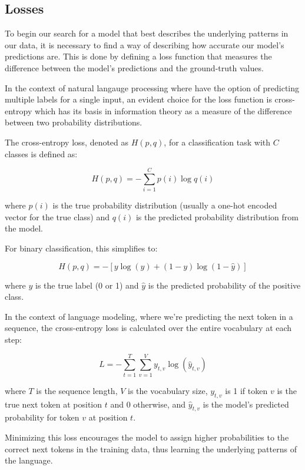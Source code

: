 \documentclass[a4paper, oneside]{discothesis}
\begin{document}
\subsection{Losses}
To begin our search for a model that best describes the underlying patterns in our data, it is necessary to find a way of describing how accurate our model's predictions are.
This is done by defining a loss function that measures the difference between the model's predictions and the ground-truth values.

In the context of natural langauge processing where have the option of predicting multiple labels for a single input, an evident choice for the loss function is cross-entropy which 
has its basis in information theory as a measure of the difference between two probability distributions.

The cross-entropy loss, denoted as $H(p,q)$, for a classification task with $C$ classes is defined as:

\begin{equation}
    H(p,q) = -\sum_{i=1}^C p(i) \log q(i)
\end{equation}

where $p(i)$ is the true probability distribution (usually a one-hot encoded vector for the true class) and $q(i)$ is the predicted probability distribution from the model.

For binary classification, this simplifies to:

\begin{equation}
    H(p,q) = -[y \log(\hat{y}) + (1-y) \log(1-\hat{y})]
\end{equation}

where $y$ is the true label (0 or 1) and $\hat{y}$ is the predicted probability of the positive class.

In the context of language modeling, where we're predicting the next token in a sequence, the cross-entropy loss is calculated over the entire vocabulary at each step:

\begin{equation}
    L = -\sum_{t=1}^T \sum_{v=1}^V y_{t,v} \log(\hat{y}_{t,v})
\end{equation}

where $T$ is the sequence length, $V$ is the vocabulary size, $y_{t,v}$ is 1 if token $v$ is the true next token at position $t$ and 0 otherwise, and $\hat{y}_{t,v}$ is the model's predicted probability for token $v$ at position $t$.

Minimizing this loss encourages the model to assign higher probabilities to the correct next tokens in the training data, thus learning the underlying patterns of the language.
\end{document}
